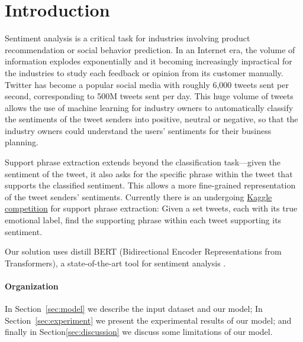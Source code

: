 \section{Introduction} \label{sec:introduction}

Sentiment analysis is a critical task for industries involving product recommendation or social behavior prediction. In an Internet era, the volume of information explodes exponentially and it becoming increasingly inpractical for the industries to study each feedback or opinion from its customer manually. Twitter has become a popular social media with roughly 6,000 tweets sent per second, corresponding to 500M tweets sent per day. This huge volume of tweets allows the use of machine learning for industry owners to automatically classify the sentiments of the tweet senders into positive, neutral or negative, so that the industry owners could understand the users' sentiments for their business planning. 

Support phrase extraction extends beyond the classification task---given the sentiment of the tweet, it also asks for the specific phrase within the tweet that supports the classified sentiment. This allows a more fine-grained representation of the tweet senders' sentiments. Currently there is an undergoing \href{https://www.kaggle.com/c/tweet-sentiment-extraction}{Kaggle competition} for support phrase extraction: Given a set tweets, each with its true emotional label, find the supporting phrase within each tweet supporting its sentiment. 


Our solution uses distill BERT (Bidirectional Encoder Representations from Transformers), a state-of-the-art tool for sentiment analysis \cite{devlin2018bert} \cite{sanh2019distilbert}. 


\paragraph{Organization} In Section~\ref{sec:model} we describe the input dataset and our model; In Section~\ref{sec:experiment} we present the experimental results of our model; and finally in Section\ref{sec:discussion} we discuss some limitations of our model.
